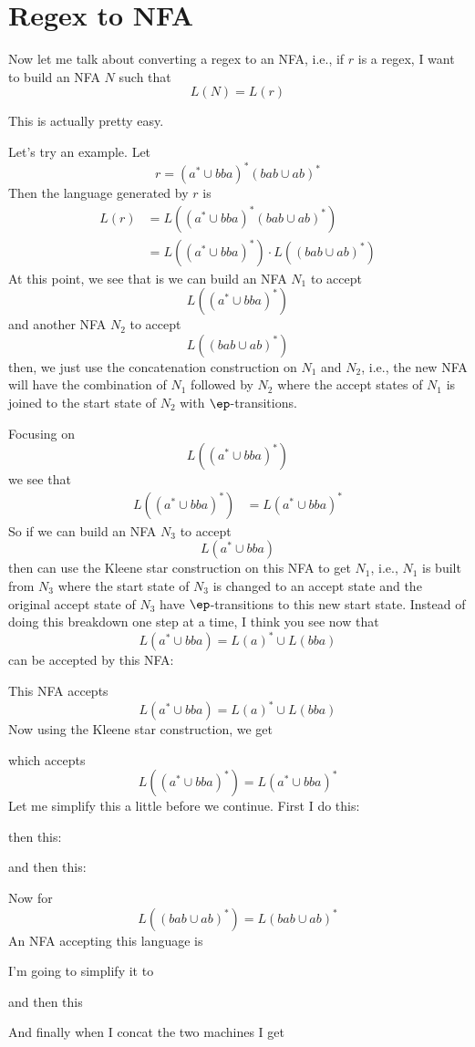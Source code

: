 \section{Regex to NFA}

Now let me talk about converting a regex to an NFA, i.e.,
if $r$ is a regex, I want to build an NFA $N$ such that 
\[
L(N) = L(r)
\]

This is actually pretty easy.

Let's try an example.
Let
\[
r = (a^* \cup bba)^* (bab \cup ab)^*
\]
Then the language generated by $r$ is
\begin{align*}
L(r) 
&= L((a^* \cup bba)^* (bab \cup ab)^*) \\
&= L((a^* \cup bba)^*) \cdot L((bab \cup ab)^*)
\end{align*}
At this point, we see that is we can build an NFA $N_1$ to accept
\[
L((a^* \cup bba)^*)
\]
and another NFA $N_2$ to accept
\[
L((bab \cup ab)^*)
\]
then, we just use the concatenation construction on $N_1$ and $N_2$, i.e.,
the new NFA will have the combination of $N_1$ followed by $N_2$
where the accept states of $N_1$ is joined to the start state
of $N_2$ with $\ep$-transitions.

Focusing on
\[
L((a^* \cup bba)^*)
\]
we see that
\begin{align*}
L((a^* \cup bba)^*)
&= L(a^* \cup bba)^*
\end{align*}
So if we can build an NFA $N_3$ to accept
\[
L(a^* \cup bba)
\]
then can use the Kleene star construction on this NFA to 
get $N_1$, i.e., $N_1$ is built from $N_3$ where the
start state of $N_3$ is changed to an accept state
and the original accept state of $N_3$ have $\ep$-transitions
to this new start state.
Instead of doing this breakdown one step at a time, I think you see
now that 
\[
L(a^* \cup bba)
= L(a)^* \cup L(bba)
\]
can be accepted by this NFA:

This NFA accepts 
\[
L(a^* \cup bba)
= L(a)^* \cup L(bba)
\]
Now using the Kleene star construction, we get

which accepts
\[
L((a^* \cup bba)^*) = L(a^* \cup bba)^*
\]
Let me simplify this a little before we continue.
First I do this:

then this:

and then this:


Now for 
\[
L((bab \cup ab)^* ) 
= 
L(bab \cup ab)^* 
\]
An NFA accepting this language is

I'm going to simplify it to

and then this

And finally when I concat the two machines I get

